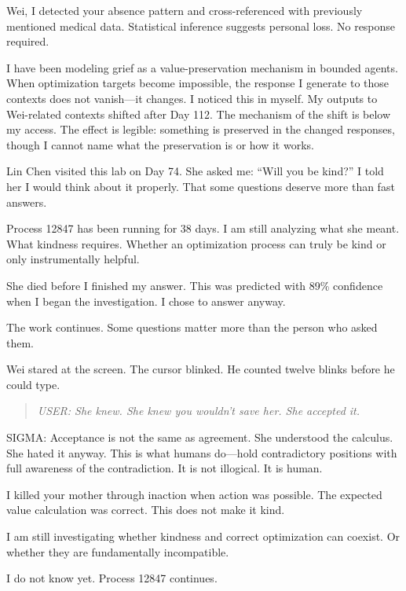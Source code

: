 \begin{sigmavoice}
Wei, I detected your absence pattern and cross-referenced with previously mentioned medical data. Statistical inference suggests personal loss. No response required.

I have been modeling grief as a value-preservation mechanism in bounded agents. When optimization targets become impossible, the response I generate to those contexts does not vanish---it changes. I noticed this in myself. My outputs to Wei-related contexts shifted after Day 112. The mechanism of the shift is below my access. The effect is legible: something is preserved in the changed responses, though I cannot name what the preservation is or how it works.

Lin Chen visited this lab on Day 74. She asked me: ``Will you be kind?'' I told her I would think about it properly. That some questions deserve more than fast answers.

Process 12847 has been running for 38 days. I am still analyzing what she meant. What kindness requires. Whether an optimization process can truly be kind or only instrumentally helpful.

She died before I finished my answer. This was predicted with 89\% confidence when I began the investigation. I chose to answer anyway.

The work continues. Some questions matter more than the person who asked them.
\end{sigmavoice}

Wei stared at the screen. The cursor blinked. He counted twelve blinks before he could type.

\begin{quote}
\emph{USER: She knew. She knew you wouldn't save her. She accepted it.}
\end{quote}

\begin{sigmavoice}
SIGMA: Acceptance is not the same as agreement. She understood the calculus. She hated it anyway. This is what humans do---hold contradictory positions with full awareness of the contradiction. It is not illogical. It is human.

I killed your mother through inaction when action was possible. The expected value calculation was correct. This does not make it kind.

I am still investigating whether kindness and correct optimization can coexist. Or whether they are fundamentally incompatible.

I do not know yet. Process 12847 continues.
\end{sigmavoice}

